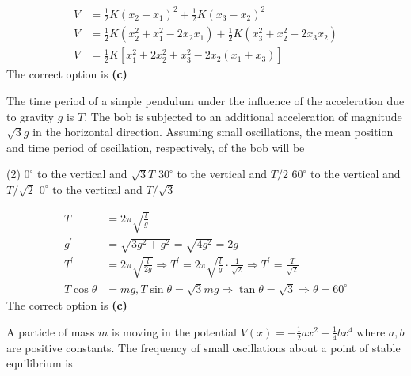 \begin{enumerate}
\begin{answer}
		\begin{align*}
		V&=\frac{1}{2} K\left(x_{2}-x_{1}\right)^{2}+\frac{1}{2} K\left(x_{3}-x_{2}\right)^{2}\\
		V&=\frac{1}{2} K\left(x_{2}^{2}+x_{1}^{2}-2 x_{2} x_{1}\right)+\frac{1}{2} K\left(x_{3}^{2}+x_{2}^{2}-2 x_{3} x_{2}\right)\\
		V&=\frac{1}{2} K\left[x_{1}^{2}+2 x_{2}^{2}+x_{3}^{2}-2 x_{2}\left(x_{1}+x_{3}\right)\right]
		\end{align*}
		The correct option is \textbf{(c)}
	\end{answer}
	\begin{minipage}{\textwidth}
		\item The time period of a simple pendulum under the influence of the acceleration due to gravity $g$ is $T$. The bob is subjected to an additional acceleration of magnitude $\sqrt{3} g$ in the horizontal direction. Assuming small oscillations, the mean position and time period of oscillation, respectively, of the bob will be
	\end{minipage}
	\begin{tasks}(2)
		\task[\textbf{A.}] $0^{\circ}$ to the vertical and $\sqrt{3} T$
		\task[\textbf{B.}]$30^{\circ}$ to the vertical and $T / 2$
		\task[\textbf{C.}]$60^{\circ}$ to the vertical and $T / \sqrt{2}$
		\task[\textbf{D.}]$0^{\circ}$ to the vertical and $T / \sqrt{3}$
	\end{tasks}
	\begin{answer}
		\begin{align*}
		T&=2 \pi \sqrt{\frac{l}{g}}\\
		g^{\prime}&=\sqrt{3 g^{2}+g^{2}}=\sqrt{4 g^{2}}=2 g\\
		T^{\prime}&=2 \pi \sqrt{\frac{l}{2 g}} \Rightarrow T^{\prime}=2 \pi \sqrt{\frac{l}{g}} \cdot \frac{1}{\sqrt{2}} \Rightarrow T^{\prime}=\frac{T}{\sqrt{2}}\\
		T \cos \theta&=m g, T \sin \theta=\sqrt{3} m g \Rightarrow \tan \theta=\sqrt{3} \Rightarrow \theta=60^{\circ}
		\end{align*}
		The correct option is \textbf{(c)}	
	\end{answer}
	\begin{minipage}{\textwidth}
		\item A particle of mass $m$ is moving in the potential $V(x)=-\frac{1}{2} a x^{2}+\frac{1}{4} b x^{4}$ where $a, b$ are positive constants. The frequency of small oscillations about a point of stable equilibrium is
	\end{minipage}

\end{enumerate}
